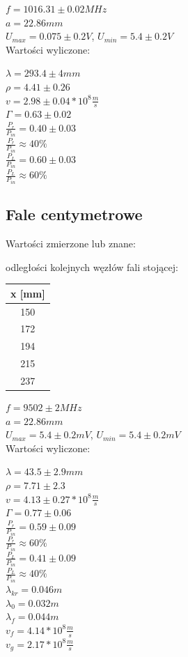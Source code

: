 \documentclass[a4paper,11pt]{article}
\begin{document}
\( f  = 1016.31 \pm 0.02  MHz \)\\
\(a = 22.86 mm \) \\
\( U _{max}  = 0.075 \pm 0.2 V \),
\( U _{min}  = 5.4 \pm 0.2 V \)\\

Wartości wyliczone:

\( \lambda = 293.4 \pm 4 mm \)\\
\( \rho = 4.41 \pm 0.26 \) \\
\( v = 2.98 \pm 0.04 * 10^8 \frac {m} {s} \)\\
\( \Gamma = 0.63 \pm 0.02 \) \\
\( \frac {P_r} {P_{in} }  = 0.40 \pm 0.03 \) \\
\( \frac {P_r} {P_{in} } \approx 40 \% \)\\
\( \frac {P_L} {P_{in} }  = 0.60 \pm 0.03 \) \\
\( \frac {P_L} {P_{in} } \approx 60 \% \)\\


\subsection{Fale centymetrowe}
Wartości zmierzone lub znane: 

odległości kolejnych węzłów fali stojącej:

\begin{tabular}{|c|}
\hline 
x [mm] \\ 
\hline 
150 \\ 
\hline 
172 \\ 
\hline 
194 \\ 
\hline 
215 \\ 
\hline 
237 \\ 
\hline 
\end{tabular} 

\( f  = 9502 \pm 2 MHz \)\\
\(a = 22.86 mm \) \\
\( U _{max}  = 5.4 \pm 0.2 mV \),
\( U _{min}  = 5.4 \pm 0.2 mV \)\\

Wartości wyliczone:

\( \lambda = 43.5 \pm 2.9 mm \)\\
\( \rho = 7.71 \pm 2.3 \) \\
\( v = 4.13 \pm 0.27 * 10^8 \frac {m} {s} \)\\
\( \Gamma = 0.77 \pm 0.06 \) \\
\( \frac {P_r} {P_{in} }  = 0.59 \pm 0.09 \) \\
\( \frac {P_r} {P_{in} } \approx 60 \% \)\\
\( \frac {P_L} {P_{in} }  = 0.41 \pm 0.09 \) \\
\( \frac {P_L} {P_{in} } \approx 40 \% \)\\
\( \lambda _{kr}  = 0.046m \)\\
\( \lambda _{0}  = 0.032 m \)\\
\( \lambda _{f}  = 0.044 m\)\\
\( v_f = 4.14 * 10^8 \frac {m} {s} \)\\
\( v_g = 2.17 * 10^8 \frac {m} {s} \)\\
\end{document}
